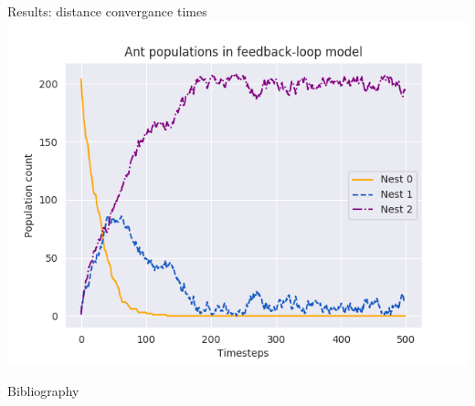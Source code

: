 \documentclass{beamer}
\begin{document}
\begin{frame}{Results: distance convergance times}
    \includegraphics[scale=0.7]{agent_based_population_model}
\end{frame}

  \begin{frame}{Bibliography}
      
  \end{frame}
\end{document}
